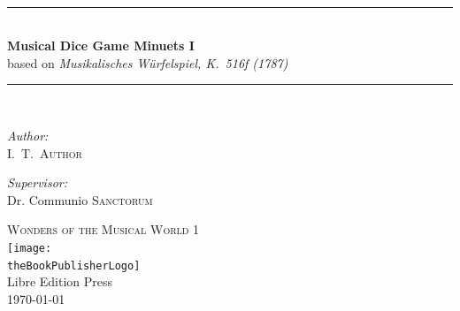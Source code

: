 \documentclass[letterpaper,x11names,svgnames,10pt]{article}
\title{\textsc{\mdgBookTitle}}
\author{\textsc{\authorFirstMidNameInit \authorLastName}}
\date{\textsc{\dateGenerated}}
\def\authorFirstMidNameInit{I.\ T.\ }
\def\authorLastName{Author}
\def\dateGenerated{\today}
\def\volNumber{I}
\def\mdgBookTitle{Musical Dice Game Minuets \volNumber}
\def\mdgBookSubTitle{Musikalisches W\"{u}rfelspiel, K.\ 516f (1787)}
\def\theBookSeries{Wonders of the Musical World 1}
\def\theBookPublisher{Libre Edition Press}
\def\theBookPublisherLogo{../images/1.png}
\newcommand{\HRule}{\rule{\linewidth}{0.5mm}}
\begin{document}


\newpage

${}_{}$\\
\vspace{1.00in}	
\thispagestyle{empty}
\begin{center}
	\HRule \\[0.4cm]
	{\huge \bfseries \mdgBookTitle} \\[0.2cm]
	{\large based on {\em \mdgBookSubTitle} }\\[0.2cm]
	\HRule \\[1.5cm]
	\begin{minipage}{0.4\textwidth}
		\begin{flushleft} \large
			\emph{Author:}\\
			\authorFirstMidNameInit \textsc{\authorLastName}
		\end{flushleft}
	\end{minipage}
	\begin{minipage}{0.4\textwidth}
		\begin{flushright} \large
			\emph{Supervisor:} \\
			Dr. Communio \textsc{Sanctorum}
		\end{flushright}
	\end{minipage}
	\vfill
	{\textsc{\Large \theBookSeries}}  \\[0.2cm] 
	\texttt{[image: \\theBookPublisherLogo]}\\ 
	{\large \theBookPublisher \\
       \dateGenerated }\\
	\vspace{2.50in}
\end{center}
\newpage


\tableofcontents\label{tabofcon}

\end{document}
